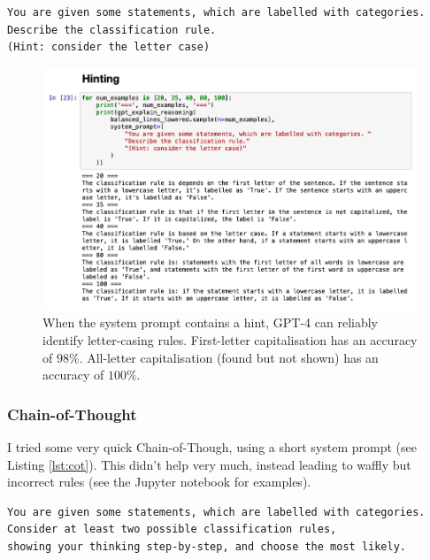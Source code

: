 \documentclass[a4paper, 11pt]{article}
\begin{document}
\begin{lstlisting}[caption={A system prompt containing a hint}, captionpos=b, frame=single, label={lst:hint}]
You are given some statements, which are labelled with categories.
Describe the classification rule.
(Hint: consider the letter case)
\end{lstlisting}


\begin{figure}
  \includegraphics[width=\linewidth]{images/hinting-reasons.png}
  \caption{When the system prompt contains a hint, GPT-4 can reliably identify letter-casing rules. First-letter capitalisation has an accuracy of $98\%$. All-letter capitalisation (found but not shown) has an accuracy of $100\%$.}
  \label{fig:hinting-reasons}
\end{figure}


\subsubsection{Chain-of-Thought}

I tried some very quick Chain-of-Though, using a short system prompt (see Listing \ref{lst:cot}). This didn't help very much, instead leading to waffly but incorrect rules (see the Jupyter notebook for examples).

\begin{lstlisting}[caption={A system prompt attempting to trigger Chain-of-Thought}, captionpos=b, frame=single, label={lst:cot}]
You are given some statements, which are labelled with categories.
Consider at least two possible classification rules,
showing your thinking step-by-step, and choose the most likely.
\end{lstlisting}
\end{document}
